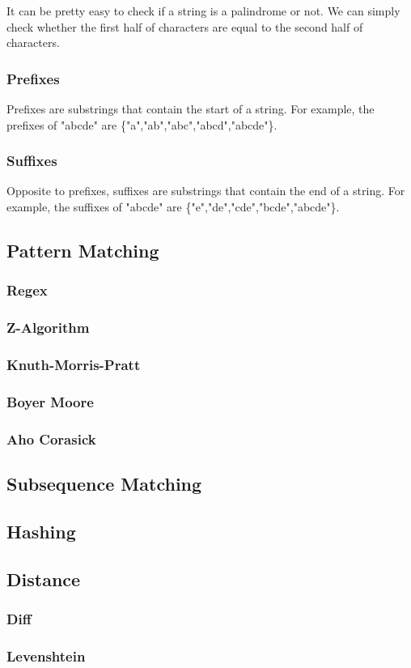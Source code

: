 It can be pretty easy to check if a string is a palindrome or not. We can simply check whether the first half of characters are equal to the second half of characters.


\subsubsection{Prefixes}

Prefixes are substrings that contain the start of a string. For example, the prefixes of "abcde" are \{"a","ab","abc","abcd","abcde"\}.

\subsubsection{Suffixes}

Opposite to prefixes, suffixes are substrings that contain the end of a string. For example, the suffixes of "abcde" are \{"e","de","cde","bcde","abcde"\}.

\subsection{Pattern Matching}
\subsubsection{Regex}
\subsubsection{Z-Algorithm}
\subsubsection{Knuth-Morris-Pratt}
\subsubsection{Boyer Moore}
\subsubsection{Aho Corasick}
\subsection{Subsequence Matching}
\subsection{Hashing}
\subsection{Distance}
\subsubsection{Diff}
\subsubsection{Levenshtein}